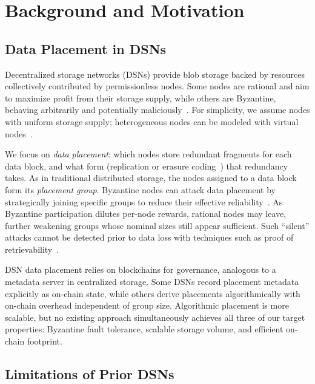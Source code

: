 \section{Background and Motivation}
\label{sec:motivation}

\subsection{Data Placement in DSNs}

Decentralized storage networks (DSNs) provide blob storage backed by resources collectively contributed by permissionless nodes.
Some nodes are rational and aim to maximize profit from their storage supply, while others are Byzantine, behaving arbitrarily and potentially maliciously~\cite{bar}.
For simplicity, we assume nodes with uniform storage supply; heterogeneous nodes can be modeled with virtual nodes~\cite{chord}.

We focus on \emph{data placement}: which nodes store redundant fragments for each data block, and what form (replication or erasure coding~\cite{rs-code}) that redundancy takes.
As in traditional distributed storage, the nodes assigned to a data block form its \emph{placement group}.
Byzantine nodes can attack data placement by strategically joining specific groups to reduce their effective reliability~\cite{ouroboros,elastico}.
As Byzantine participation dilutes per-node rewards, rational nodes may leave, further weakening groups whose nominal sizes still appear sufficient.
Such ``silent'' attacks cannot be detected prior to data loss with techniques such as proof of retrievability~\cite{por}.

DSN data placement relies on blockchains for governance, analogous to a metadata server in centralized storage.
Some DSNs record placement metadata explicitly as on-chain state, while others derive placements algorithmically with on-chain overhead independent of group size.
Algorithmic placement is more scalable, but no existing approach simultaneously achieves all three of our target properties: Byzantine fault tolerance, scalable storage volume, and efficient on-chain footprint.

\subsection{Limitations of Prior DSNs}
\label{sec:motivation:review}

